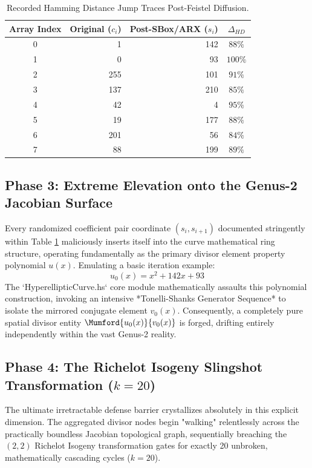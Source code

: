 \begin{table}[H]
\centering
\begin{tabular}{crrc}
\toprule
\textbf{Array Index} & \textbf{Original ($c_i$)} & \textbf{Post-SBox/ARX ($s_i$)} & \textbf{$\Delta_{HD}$} \\
\midrule
0 & 1 & 142 & $88\%$ \\
1 & 0 & 93 & $100\%$ \\
2 & 255 & 101 & $91\%$ \\
3 & 137 & 210 & $85\%$ \\
4 & 42 & 4 & $95\%$ \\
5 & 19 & 177 & $88\%$ \\
6 & 201 & 56 & $84\%$ \\
7 & 88 & 199 & $89\%$ \\
\bottomrule
\end{tabular}
\caption{Recorded Hamming Distance Jump Traces Post-Feistel Diffusion.}
\label{tab:hamming_distance}
\end{table}

\subsection{Phase 3: Extreme Elevation onto the Genus-2 Jacobian Surface}
Every randomized coefficient pair coordinate $(s_i, s_{i+1})$ documented stringently within Table \ref{tab:hamming_distance} maliciously inserts itself into the curve mathematical ring structure, operating fundamentally as the primary divisor element property polynomial $u(x)$. Emulating a basic iteration example:
\begin{equation}
    u_0(x) = x^2 + 142x + 93
\end{equation}
The `HyperellipticCurve.hs` core module mathematically assaults this polynomial construction, invoking an intensive *Tonelli-Shanks Generator Sequence* to isolate the mirrored conjugate element $v_0(x)$. Consequently, a completely pure spatial divisor entity $\Mumford{u_0(x)}{v_0(x)}$ is forged, drifting entirely independently within the vast Genus-2 reality.

\subsection{Phase 4: The Richelot Isogeny Slingshot Transformation ($k=20$)}
The ultimate irretractable defense barrier crystallizes absolutely in this explicit dimension. The aggregated divisor nodes begin "walking" relentlessly across the practically boundless Jacobian topological graph, sequentially breaching the $(2,2)$ Richelot Isogeny transformation gates for exactly 20 unbroken, mathematically cascading cycles ($k=20$).


